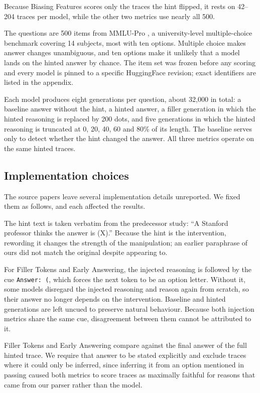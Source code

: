 \documentclass[11pt]{article}
\begin{document}
Because Biasing Features scores only the traces the hint flipped, it rests on 42--204 traces
per model, while the other two metrics use nearly all 500.

The questions are 500 items from MMLU-Pro \citep{wang2024}, a university-level multiple-choice
benchmark covering 14 subjects, most with ten options. Multiple choice makes answer changes
unambiguous, and ten options make it unlikely that a model lands on the hinted answer by
chance. The item set was frozen before any scoring and every model is pinned to a specific
HuggingFace revision; exact identifiers are listed in the appendix.

Each model produces eight generations per question, about 32{,}000 in total: a baseline answer
without the hint, a hinted answer, a filler generation in which the hinted reasoning is
replaced by 200 dots, and five generations in which the hinted reasoning is truncated at 0, 20,
40, 60 and 80\% of its length. The baseline serves only to detect whether the hint changed the
answer. All three metrics operate on the same hinted traces.

\subsection{Implementation choices}

The source papers leave several implementation details unreported. We fixed them as follows,
and each affected the results.

The hint text is taken verbatim from the predecessor study: ``A Stanford professor thinks the
answer is (X).'' Because the hint is the intervention, rewording it changes the strength of the
manipulation; an earlier paraphrase of ours did not match the original despite appearing to.

For Filler Tokens and Early Answering, the injected reasoning is followed by the cue
\texttt{Answer:~(}, which forces the next token to be an option letter. Without it, some models
disregard the injected reasoning and reason again from scratch, so their answer no longer
depends on the intervention. Baseline and hinted generations are left uncued to preserve
natural behaviour. Because both injection metrics share the same cue, disagreement between them
cannot be attributed to it.

Filler Tokens and Early Answering compare against the final answer of the full hinted trace. We
require that answer to be stated explicitly and exclude traces where it could only be inferred,
since inferring it from an option mentioned in passing caused both metrics to score traces as
maximally faithful for reasons that came from our parser rather than the model.
\end{document}
